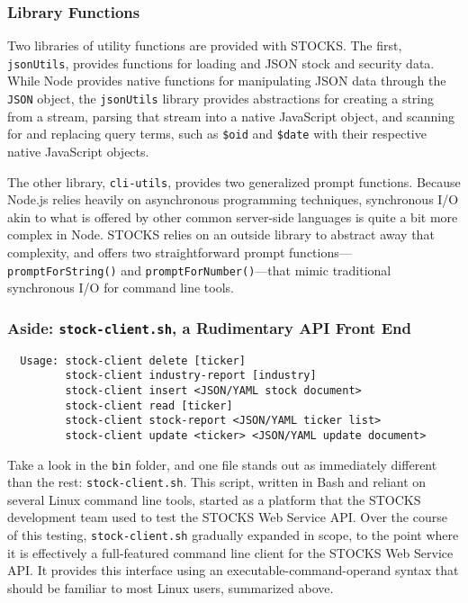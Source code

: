 \documentclass[
11pt,
titlepage,
]{article}
\begin{document}
\subsubsection{Library Functions}

Two libraries of utility functions are provided with STOCKS. The first,
\texttt{jsonUtils}, provides functions for loading and JSON stock and security
data. While Node provides native functions for manipulating JSON data through
the \texttt{JSON} object, the \texttt{jsonUtils} library provides
abstractions for creating a string from a stream, parsing that stream into a
native JavaScript object, and scanning for and replacing query terms, such as
\texttt{\$oid} and \texttt{\$date} with their respective native JavaScript
objects.

The other library, \texttt{cli-utils}, provides two generalized prompt
functions. Because Node.js relies heavily on asynchronous programming
techniques, synchronous I/O akin to what is offered by other common server-side
languages is quite a bit more complex in Node. STOCKS relies on an outside
library to abstract away that complexity, and offers two straightforward prompt
functions---\texttt{promptForString()} and \texttt{promptForNumber()}---that
mimic traditional synchronous I/O for command line tools.

\subsubsection{Aside: \texttt{stock-client.sh}, a Rudimentary API Front End}

\begin{lstlisting}
  Usage: stock-client delete [ticker]
         stock-client industry-report [industry]
         stock-client insert <JSON/YAML stock document>
         stock-client read [ticker]
         stock-client stock-report <JSON/YAML ticker list>
         stock-client update <ticker> <JSON/YAML update document>
\end{lstlisting}

Take a look in the \texttt{bin} folder, and one file stands out as immediately
different than the rest: \texttt{stock-client.sh}. This script, written in Bash
and reliant on several Linux command line tools, started as a platform that the
STOCKS development team used to test the STOCKS Web Service API. Over the course
of this testing, \texttt{stock-client.sh} gradually expanded in scope, to the
point where it is effectively a full-featured command line client for the STOCKS
Web Service API. It provides this interface using an executable-command-operand
syntax that should be familiar to most Linux users, summarized above.
\end{document}
